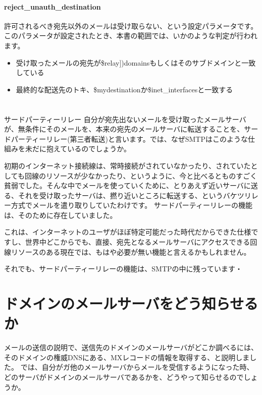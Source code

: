 \paragraph{reject\_unauth\_destination}
許可されるべき宛先以外のメールは受け取らない、という設定パラメータです。このパラメータが設定されたとき、本書の範囲では、いかのような判定が行われます。

\begin{itemize}
  \item 受け取ったメールの宛先が\$relay])domainsもしくはそのサブドメインと一致している
  \item 最終的な配送先のトキ、\$mydestinationか\$inet\_interfacesと一致する
\end{itemize}

\section*{}
\begin{itembox}[l]{サードパーティーリレー}
自分が宛先出ないメールを受け取ったメールサーバが、無条件にそのメールを、本来の宛先のメールサーバに転送することを、サードパーティーリレー(第三者転送)と言います。では、なぜSMTPはこのような仕組みを未だに抱えているのでしょうか。

初期のインターネット接続線は、常時接続がされていなかったり、されていたとしても回線のリソースが少なかったり、というように、今と比べるとものすごく貧弱でした。そんな中でメールを使っていくために、とりあえず近いサーバに送る、それを受け取ったサーバは、撚り近いところに転送する、というバケツリレー方式でメールを遣り取りしていたわけです。
サードパーティーリレーの機能は、そのために存在していました。

これは、インターネットのユーザがほぼ特定可能だった時代だからできた仕様ですし、世界中どこからでも、直接、宛先となるメールサーバにアクセスできる回線リソースのある現在では、もはや必要が無い機能と言えるかもしれません。

それでも、サードパーティーリレーの機能は、SMTPの中に残っています・

\end{itembox}


\section{ドメインのメールサーバをどう知らせるか}
メールの送信の説明で、送信先のドメインのメールサーバがどこか調べるには、そのドメインの権威DNSにある、MXレコードの情報を取得する、と説明しました。
では、自分がガ他のメールサーバからメールを受信するようになった時、どのサーバがドメインのメールサーバであるかを、どうやって知らせるのでしょうか。

